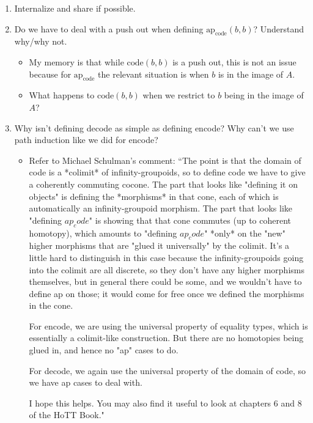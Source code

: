 \documentclass[11pt]{amsart}
\theoremstyle{remark}
\theoremstyle{definition}
\begin{document}
	\begin{enumerate}
	\item Internalize and share if possible.
	\item Do we have to deal with a push out when defining $\text{ap}_{\text{code}}(b, b)$? Understand why/why not.
		\begin{itemize}
		\item My memory is that while $\text{code}(b,b)$ is a push out, this is not an issue because for $\text{ap}_{\text{code}}$ the relevant situation is when $b$ is in the image of $A$.
		\item What happens to $\text{code}(b,b)$ when we restrict to $b$ being in the image of $A$?
		\end{itemize}
	\item Why isn't defining decode as simple as defining encode? Why can't we use path induction like we did for encode?
		\begin{itemize}
		\item Refer to Michael Schulman's comment: ``The point is that the domain of code is a *colimit* of
infinity-groupoids, so to define code we have to give a coherently
commuting cocone.  The part that looks like "defining it on objects"
is defining the *morphisms* in that cone, each of which is
automatically an infinity-groupoid morphism.  The part that looks like
"defining $ap_code$" is showing that that cone commutes (up to coherent
homotopy), which amounts to "defining $ap_code$" *only* on the "new"
higher morphisms that are "glued it universally" by the colimit.  It's
a little hard to distinguish in this case because the
infinity-groupoids going into the colimit are all discrete, so they
don't have any higher morphisms themselves, but in general there could
be some, and we wouldn't have to define ap on those; it would come for
free once we defined the morphisms in the cone.

For encode, we are using the universal property of equality types,
which is essentially a colimit-like construction.  But there are no
homotopies being glued in, and hence no "ap" cases to do.

For decode, we again use the universal property of the domain of code,
so we have ap cases to deal with.

I hope this helps.  You may also find it useful to look at chapters 6
and 8 of the HoTT Book."
		\end{itemize}
	\end{enumerate}




\end{document}
